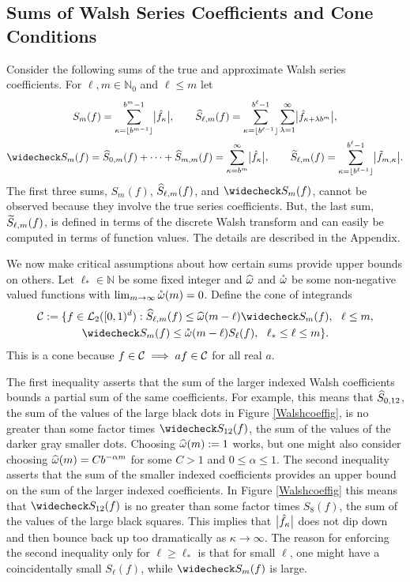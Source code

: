 \documentclass[graybox,footinfo]{svmult}
\newcommand{\N}{\mathbb{N}} %
\begin{document}
\subsection{Sums of Walsh Series Coefficients and Cone Conditions}
Consider the following sums of the true and approximate Walsh series coefficients.  For $\ell,m \in \N_0$ and $\ell \le m$ let
\begin{gather*}
S_m(f) =  \sum_{\kappa=\left \lfloor b^{m-1} \right \rfloor}^{b^{m}-1} \bigabs{\hf_{\kappa}}, \qquad 
\hS_{\ell,m}(f)  = \sum_{\kappa=\left \lfloor b^{\ell-1} \right \rfloor}^{b^{\ell}-1} \sum_{\lambda=1}^{\infty} \bigabs{ \hf_{\kappa+\lambda b^{m}}}, \\
\wcS_m(f)=\hS_{0,m}(f) + \cdots + \hS_{m,m}(f)=
\sum_{\kappa=b^{m}}^{\infty} \bigabs{\hf_{\kappa}}, \qquad
\tS_{\ell,m}(f) = \sum_{\kappa=\left \lfloor b^{\ell-1}\right \rfloor}^{b^{\ell}-1} \bigabs{\tf_{m,\kappa}}.
\end{gather*}
The first three sums, $S_{m}(f)$, $\widehat{S}_{\ell,m}(f)$, and $\wcS_m(f)$, cannot be observed because they involve the true series coefficients. But, the last sum, $\widetilde{S}_{\ell,m}(f)$, is defined in terms of the discrete Walsh transform and can easily be computed in terms of function values.  The details are described in the Appendix.

We now make critical assumptions about how certain sums provide upper bounds on others.  Let $\ell_* \in \N$ be some fixed integer and $\widehat{\omega}$ and $\mathring{\omega}$ be some non-negative valued functions with $\lim_{m \to \infty} \mathring{\omega}(m) = 0$.  Define the cone of integrands
\begin{multline} \label{conecond}
\cc:=\{f \in \cl_2(\cube) : \hS_{\ell,m}(f) \le \homega(m-\ell) \wcS_m(f),\ \ \ell \le m, \\
\wcS_m(f) \le \wcomega(m-\ell) S_{\ell}(f),\ \  \ell_* \le \ell \le m\}.
\end{multline}
This is a cone because $f \in \mathcal{C} \implies af \in \mathcal{C}$ for all real $a$.

The first inequality asserts that the sum of the larger indexed Walsh coefficients bounds a partial sum of the same coefficients.  For example, this means that $\widehat{S}_{0,12}$, the sum of the values of the large black dots in Figure \ref{Walshcoeffig}, is no greater than some factor times $\wcS_{12}(f)$, the sum of the values of the darker gray smaller dots.  Choosing $\widehat{\omega}(m):=1$ works, but one might also consider choosing $\widehat{\omega}(m)=C b^{-\alpha m}$ for some $C>1$ and $0\le \alpha \le 1$.  The second inequality asserts that the sum of the smaller indexed coefficients provides an upper bound on the sum of the larger indexed coefficients.  In Figure \ref{Walshcoeffig} this means that $\wcS_{12}(f)$ is no greater than some factor times $S_8(f)$, the sum of the values of the large black squares.  This implies that $\bigl \lvert \hat{f}_{\kappa} \bigr \rvert$ does not dip down and then bounce back up too dramatically as $\kappa \to \infty$. The reason for enforcing the second inequality only for $\ell \ge \ell_*$ is that for small $\ell$, one might have a coincidentally small $S_\ell(f)$, while $\wcS_m(f)$ is large.
\end{document}

